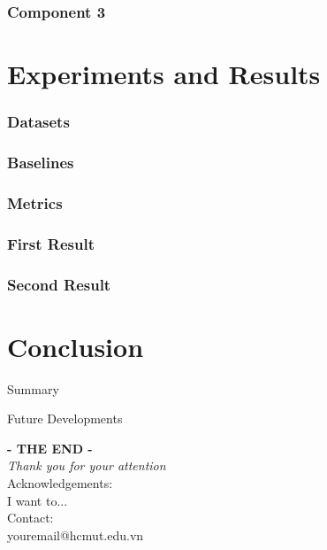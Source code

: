 \documentclass[aspectratio=169]{beamer}
\begin{document}
	\begin{frame}
		\frametitle{Component 3}
		
	\end{frame}
	
	\section{Experiments and Results}
	\begin{frame}
		\frametitle{Datasets}
		
	\end{frame}
	
	\begin{frame}
		\frametitle{Baselines}
		
		
	\end{frame}
	
	\begin{frame}
		\frametitle{Metrics}
		
	\end{frame}
	
	\begin{frame}
		\frametitle{First Result}
		
	\end{frame}
	
	\begin{frame}
		\frametitle{Second Result}
		
	\end{frame}
	
	\section{Conclusion}
	\begin{frame}{Summary}
		
	\end{frame}
	
	
	\begin{frame}{Future Developments}
		
	\end{frame}
	
	
	\begin{frame}
		\centering
		\vspace{1cm}
		\textbf{\Huge{- THE END - }}\\
		\vspace{0.2cm}
		\textit{\Large{Thank you for your attention}}\\
		\vspace{15pt}
		Acknowledgements:\\
		I want to...\\
		\vspace{20pt}
		Contact:\\
		youremail@hcmut.edu.vn
	\end{frame}
	
%		
%		
	
\end{document}
